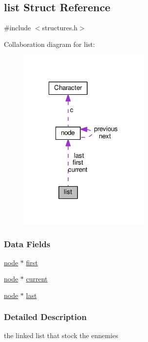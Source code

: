 \hypertarget{structlist}{\subsection{list Struct Reference}
\label{structlist}
}


{\ttfamily \#include $<$structures.\-h$>$}



Collaboration diagram for list\-:\nopagebreak
\begin{figure}[H]
\begin{center}
\leavevmode
\includegraphics[width=186pt]{structlist__coll__graph}
\end{center}
\end{figure}
\subsubsection*{Data Fields}
\begin{DoxyCompactItemize}
\item 
\hyperlink{structnode}{node} $\ast$ \hyperlink{structlist_a02b4428208fd0060bb54d5bb726702d4}{first}
\item 
\hyperlink{structnode}{node} $\ast$ \hyperlink{structlist_a79bec8ecf9f3599d31d97683cc6f6c54}{current}
\item 
\hyperlink{structnode}{node} $\ast$ \hyperlink{structlist_a1e751cb2643f0c20321d5b233e4fdf65}{last}
\end{DoxyCompactItemize}


\subsubsection{Detailed Description}
the linked list that stock the ennemies 

